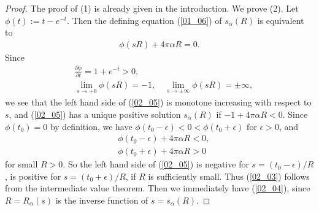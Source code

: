 \documentclass[12pt,a4paper]{article}
\begin{document}
\begin{proof}
 The proof of (1) is already given in the introduction.
We prove (2).
Let $\phi(t):=t-e^{-t}$.
Then the defining equation (\ref{01_06}) of $s_\alpha(R)$
is equivalent to
\begin{align}
 \phi(sR)+4\pi\alpha R=0.
\label{02_05}
\end{align}
Since
\begin{align*}
&\  \frac{\partial \phi}{\partial t}=1+e^{-t}>0,\\
&\ \lim_{s\to +0}\phi(sR)=-1,\quad
\lim_{s\to \pm\infty}\phi(sR)=\pm\infty,
\end{align*}
we see that 
the left hand side of (\ref{02_05}) 
is monotone increasing with respect to $s$,
and (\ref{02_05}) has a unique positive solution $s_\alpha(R)$ 
if $-1+4\pi\alpha R<0$.
Since $\phi(t_0)=0$ by definition,
we have $\phi(t_0-\epsilon)<0<\phi(t_0+\epsilon)$ for $\epsilon>0$,
and 
\begin{align*}
&\  \phi\left(t_0-\epsilon\right)+4\pi\alpha R<0,\\
&\  \phi\left(t_0+\epsilon\right)+4\pi\alpha R>0
\end{align*}
for small $R>0$.
So the left hand side of (\ref{02_05}) 
is negative for $s=(t_0-\epsilon)/R$,
is positive for $s=(t_0+\epsilon)/R$,
if $R$ is sufficiently small.
Thus (\ref{02_03}) follows from the intermediate value theorem.
Then we immediately have (\ref{02_04}),
since $R=R_\alpha(s)$ is the inverse function of $s=s_\alpha(R)$.
\end{proof}
\end{document}
